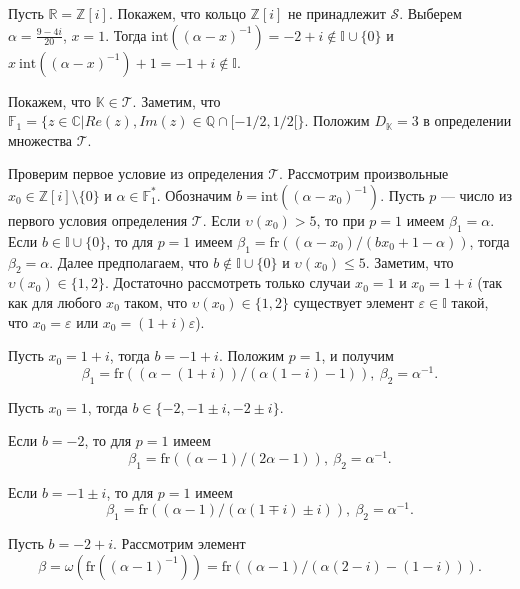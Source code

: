 \documentclass[_00_dissertation.tex]{subfiles}
\begin{document}
\begin{example}\label{example:Z[i]}
    Пусть $\mathbb{R}=\mathbb{Z}[i]$.
    Покажем, что кольцо $\mathbb{Z}[i]$ не принадлежит $\mathcal{S}.$
    Выберем $\alpha=\frac{9-4i}{20}$, $x=1$.
    Тогда $\textrm{int}((\alpha-x)^{-1})=-2+i \notin \mathbb{I} \cup \{0\}$ и $x \ \textrm{int}((\alpha-x)^{-1})+1=-1+i \notin \mathbb{I}.$

    Покажем, что $\mathbb{K}\in\mathcal{T}$.
    Заметим, что $\mathbb{F}_1=\{z\in\mathbb{C}|Re(z),Im(z)\in\mathbb{Q}\cap[-1/2,1/2[\}$.
    Положим $D_{\mathbb{K}}=3$ в определении множества $\mathcal{T}$.

    Проверим первое условие из определения $\mathcal{T}$.
    Рассмотрим произвольные $x_0\in\mathbb{Z}[i]\setminus\{0\}$ и $\alpha\in\mathbb{F}^*_1$.
    Обозначим $b=\textrm{int}((\alpha-x_0)^{-1})$.
    Пусть $p$ --- число из первого условия определения $\mathcal{T}$.
    Если $\upsilon(x_0)>5$, то при $p=1$ имеем $\beta_1=\alpha$.
    Если $b\in\mathbb{I}\cup\{0\}$, то для $p=1$ имеем $\beta_1=\textrm{fr}((\alpha-x_0)/(bx_0+1-\alpha))$, тогда $\beta_2=\alpha$.
    Далее предполагаем, что $b\not\in\mathbb{I}\cup\{0\}$ и $\upsilon(x_0)\le 5$.
    Заметим, что $\upsilon(x_0)\in\{1,2\}$.
    Достаточно рассмотреть только случаи $x_0=1$ и $x_0=1+i$ (так как для любого $x_0$ таком, что $\upsilon(x_0)\in\{1,2\}$ существует элемент $\varepsilon\in\mathbb{I}$ такой, что $x_0=\varepsilon$ или $x_0=(1+i)\varepsilon$).

    Пусть $x_0=1+i$, тогда $b=-1+i$.
    Положим $p=1$, и получим
    \begin{equation*}
        \beta_1=\textrm{fr}((\alpha-(1+i))/(\alpha(1-i)-1)),\ \beta_2=\alpha^{-1}.
    \end{equation*}

    Пусть $x_0=1$, тогда $b\in\{-2,-1\pm i,-2\pm i\}$.

    Если $b=-2$, то для $p=1$ имеем
    \begin{equation*}
        \beta_1=\textrm{fr}((\alpha-1)/(2\alpha-1)),\ \beta_2=\alpha^{-1}.
    \end{equation*}

    Если $b=-1\pm i$, то для $p=1$ имеем
    \begin{equation*}
        \beta_1=\textrm{fr}((\alpha-1)/(\alpha(1\mp i)\pm i)),\ \beta_2=\alpha^{-1}.
    \end{equation*}

    Пусть $b=-2+i$. Рассмотрим элемент
    \begin{equation*}
        \beta=\omega(\textrm{fr}((\alpha-1)^{-1}))=\textrm{fr}((\alpha-1)/(\alpha(2-i)-(1-i))).
    \end{equation*}


\end{example}
\end{document}
